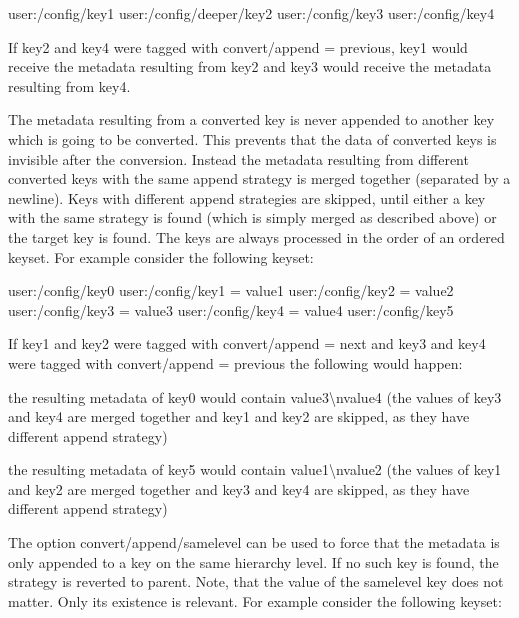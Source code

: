 \begin{DoxyCode}
user:/config/key1
user:/config/deeper/key2
user:/config/key3
user:/config/key4
\end{DoxyCode}


If key2 and key4 were tagged with {\ttfamily convert/append = previous}, key1 would receive the metadata resulting from key2 and key3 would receive the metadata resulting from key4.

The metadata resulting from a converted key is never appended to another key which is going to be converted. This prevents that the data of converted keys is invisible after the conversion. Instead the metadata resulting from different converted keys with the same append strategy is merged together (separated by a newline). Keys with different append strategies are skipped, until either a key with the same strategy is found (which is simply merged as described above) or the target key is found. The keys are always processed in the order of an ordered keyset. For example consider the following keyset\+:


\begin{DoxyCode}
user:/config/key0
user:/config/key1 = value1
user:/config/key2 = value2
user:/config/key3 = value3
user:/config/key4 = value4
user:/config/key5
\end{DoxyCode}


If key1 and key2 were tagged with {\ttfamily convert/append = next} and key3 and key4 were tagged with {\ttfamily convert/append = previous} the following would happen\+:


\begin{DoxyItemize}
\item the resulting metadata of key0 would contain {\ttfamily value3\textbackslash{}nvalue4} (the values of key3 and key4 are merged together and key1 and key2 are skipped, as they have different append strategy)
\item the resulting metadata of key5 would contain {\ttfamily value1\textbackslash{}nvalue2} (the values of key1 and key2 are merged together and key3 and key4 are skipped, as they have different append strategy)
\end{DoxyItemize}

The option {\ttfamily convert/append/samelevel} can be used to force that the metadata is only appended to a key on the same hierarchy level. If no such key is found, the strategy is reverted to parent. Note, that the value of the samelevel key does not matter. Only its existence is relevant. For example consider the following keyset\+:


